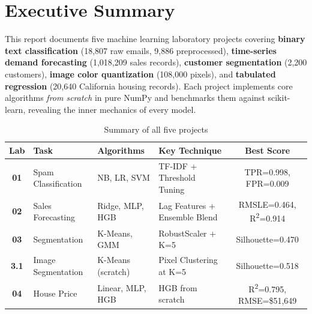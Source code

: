 \chapter{Executive Summary}

This report documents five machine learning laboratory projects covering \textbf{binary text classification} (18,807 raw emails, 9,886 preprocessed), \textbf{time-series demand forecasting} (1,018,209 sales records), \textbf{customer segmentation} (2,200 customers), \textbf{image color quantization} (108,000 pixels), and \textbf{tabulated regression} (20,640 California housing records). Each project implements core algorithms \textit{from scratch} in pure NumPy and benchmarks them against scikit-learn, revealing the inner mechanics of every model.

\begin{table}[H]
\centering{}
\begin{tabular}{c L{3cm} L{3cm} L{4cm} c}
\toprule{}\color{white}\textbf{Lab} &\color{white}\textbf{Task} &\color{white}\textbf{Algorithms} &\color{white}\textbf{Key Technique} &\color{white}\textbf{Best Score}\\
\midrule
\color{redaccent}\textbf{01} & Spam Classification & NB, LR, SVM & TF-IDF + Threshold Tuning & TPR=0.998, FPR=0.009\\
\color{orangeaccent}\textbf{02} & Sales Forecasting & Ridge, MLP, HGB & Lag Features + Ensemble Blend & RMSLE=0.464, R\textsuperscript{2}=0.914\\
\color{greenaccent}\textbf{03} & Segmentation & K-Means, GMM & RobustScaler + K=5 & Silhouette=0.470\\
\color{purpleaccent}\textbf{3.1} & Image Segmentation & K-Means (scratch) & Pixel Clustering at K=5 & Silhouette=0.518\\
\color{sectionblue}\textbf{04} & House Price & Linear, MLP, HGB & HGB from scratch & R\textsuperscript{2}=0.795, RMSE=\$51,649\\
\bottomrule
\end{tabular}
\caption{Summary of all five projects}
\end{table}
